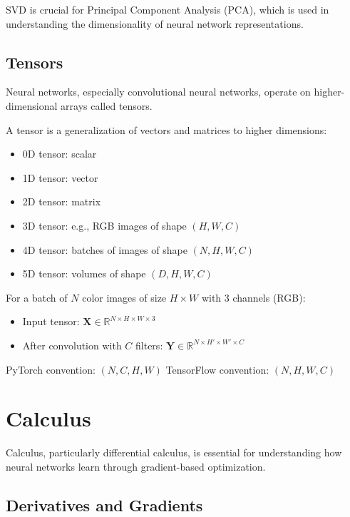 SVD is crucial for Principal Component Analysis (PCA), which is used in understanding the dimensionality of neural network representations.

\subsection{Tensors}

Neural networks, especially convolutional neural networks, operate on higher-dimensional arrays called tensors.

\begin{definition}[Tensor]
A tensor is a generalization of vectors and matrices to higher dimensions:
\begin{itemize}
    \item 0D tensor: scalar
    \item 1D tensor: vector
    \item 2D tensor: matrix
    \item 3D tensor: e.g., RGB images of shape $(H, W, C)$
    \item 4D tensor: batches of images of shape $(N, H, W, C)$
    \item 5D tensor: volumes of shape $(D, H, W, C)$
\end{itemize}
\end{definition}

\begin{example}
For a batch of $N$ color images of size $H \times W$ with 3 channels (RGB):
\begin{itemize}
    \item Input tensor: $\mathbf{X} \in \mathbb{R}^{N \times H \times W \times 3}$
    \item After convolution with $C$ filters: $\mathbf{Y} \in \mathbb{R}^{N \times H' \times W' \times C}$
\end{itemize}
PyTorch convention: $(N, C, H, W)$
TensorFlow convention: $(N, H, W, C)$
\end{example}

\section{Calculus}

Calculus, particularly differential calculus, is essential for understanding how neural networks learn through gradient-based optimization.

\subsection{Derivatives and Gradients}

